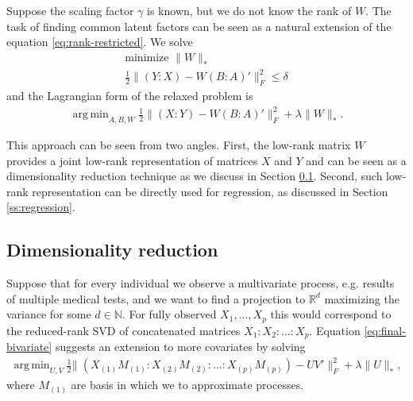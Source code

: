 \documentclass[preprint]{imsart}
\numberwithin{equation}{section}
\theoremstyle{plain}
\newcommand{\R}{\mathbb{R}}
\newcommand{\N}{\mathbb{N}}
\DeclareMathOperator*{\argmin}{arg\,min}
\begin{document}
Suppose the scaling factor $\gamma$ is known, but we do not know the rank of $W$. The task of finding common latent factors can be seen as a natural extension of the equation \eqref{eq:rank-restricted}. We solve
\begin{gather*}
\text{minimize } \|W\|_*\\
\frac{1}{2} \| (Y:X) - W(B:A)' \|_F^2 \leq \delta
\end{gather*}
and the Lagrangian form of the relaxed problem is
\begin{align}
  \argmin_{A,B,W} \frac{1}{2} \| (X:Y) - W(B:A)' \|_F^2 + \lambda \| W \|_*.  \label{eq:final-bivariate}
\end{align}

This approach can be seen from two angles. First, the low-rank matrix $W$ provides a joint low-rank representation of matrices $X$ and $Y$ and can be seen as a dimensionality reduction technique as we discuss in Section \ref{ss:dim-red}. Second, such low-rank representation can be directly used for regression, as discussed in Section \ref{ss:regression}.


\subsection{Dimensionality reduction}\label{ss:dim-red}

Suppose that for every individual we observe a multivariate process, e.g. results of multiple medical tests, and we want to find a projection to $\R^d$ maximizing the variance for some $d \in \N$. For fully observed $X_1,...,X_p$ this would correspond to the reduced-rank SVD of concatenated matrices $X_1:X_2:...:X_p$. %
Equation \eqref{eq:final-bivariate} suggests an extension to more covariates by solving
\begin{align*}%
\argmin_{U,V} \frac{1}{2} &\| (X_{(1)}M_{(1)}:X_{(2)}M_{(2)}:...:X_{(p)}M_{(p)}) - U V' \|_F^2 + \lambda\|U\|_*,
\end{align*}
where $M_{(1)}$ are basis in which we to approximate processes.
\end{document}
